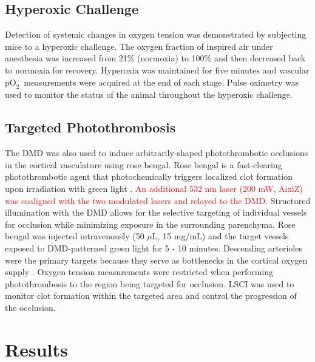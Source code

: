 \documentclass[12pt]{spieman}  %
\newcommand{\pO}{\ensuremath{\text{pO}_2}}
\begin{document}
\begin{spacing}{2}

\subsection{Hyperoxic Challenge}
Detection of systemic changes in oxygen tension was demonstrated by subjecting mice to a hyperoxic challenge. The oxygen fraction of inspired air under anesthesia was increased from 21\% (normoxia) to 100\% and then decreased back to normoxia for recovery. Hyperoxia was maintained for five minutes and vascular \pO\ measurements were acquired at the end of each stage. Pulse oximetry was used to monitor the status of the animal throughout the hyperoxic challenge.


\subsection{Targeted Photothrombosis}
The DMD was also used to induce arbitrarily-shaped photothrombotic occlusions in the cortical vasculature using rose bengal. Rose bengal is a fast-clearing photothrombotic agent that photochemically triggers localized clot formation upon irradiation with green light \cite{Watson:1985bp,Klaassen:1976kg,Wilson:1991tv}. \textcolor{red}{An additional 532 nm laser (200 mW, AixiZ) was coaligned with the two modulated lasers and relayed to the DMD.} Structured illumination with the DMD allows for the selective targeting of individual vessels for occlusion while minimizing exposure in the surrounding parenchyma. Rose bengal was injected intravenously (50 $\mu$L, 15 mg/mL) and the target vessels exposed to DMD-patterned green light for 5 - 10 minutes. Descending arterioles were the primary targets because they serve as bottlenecks in the cortical oxygen supply \cite{Nishimura:2007hk}. Oxygen tension measurements were restricted when performing photothrombosis to the region being targeted for occlusion. LSCI was used to monitor clot formation within the targeted area and control the progression of the occlusion.


\section{Results}
\label{sect:results}


\end{spacing}
\end{document}
